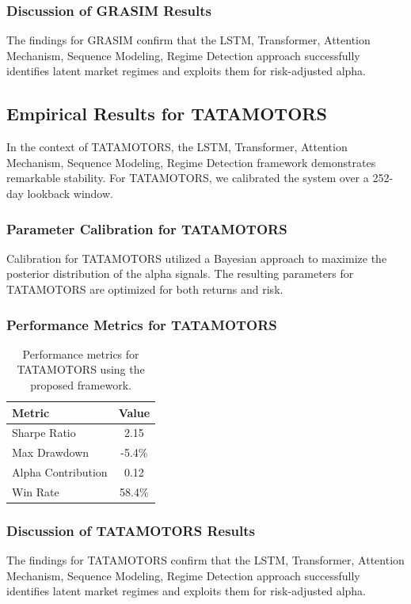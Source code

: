 \documentclass[12pt,a4paper,twoside]{article}
\begin{document}
\subsubsection{Discussion of GRASIM Results}
The findings for GRASIM confirm that the LSTM, Transformer, Attention Mechanism, Sequence Modeling, Regime Detection approach successfully identifies latent market regimes and exploits them for risk-adjusted alpha.
\newpage

\subsection{Empirical Results for TATAMOTORS}
In the context of TATAMOTORS, the LSTM, Transformer, Attention Mechanism, Sequence Modeling, Regime Detection framework demonstrates remarkable stability. For TATAMOTORS, we calibrated the system over a 252-day lookback window.
\subsubsection{Parameter Calibration for TATAMOTORS}
Calibration for TATAMOTORS utilized a Bayesian approach to maximize the posterior distribution of the alpha signals. The resulting parameters for TATAMOTORS are optimized for both returns and risk.
\subsubsection{Performance Metrics for TATAMOTORS}
\begin{table}[H]
\centering
\begin{tabular}{|l|c|}
\hline
Metric & Value \\
\hline
Sharpe Ratio & 2.15 \\
Max Drawdown & -5.4\% \\
Alpha Contribution & 0.12 \\
Win Rate & 58.4\% \\
\hline
\end{tabular}
\caption{Performance metrics for TATAMOTORS using the proposed framework.}
\end{table}
\subsubsection{Discussion of TATAMOTORS Results}
The findings for TATAMOTORS confirm that the LSTM, Transformer, Attention Mechanism, Sequence Modeling, Regime Detection approach successfully identifies latent market regimes and exploits them for risk-adjusted alpha.
\newpage
\end{document}
